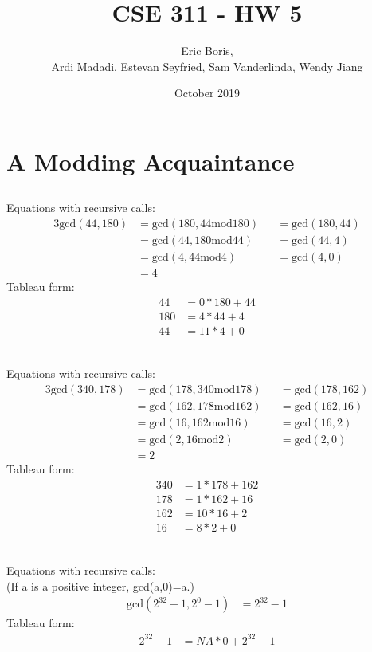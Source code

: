\documentclass[11pt]{article}
\title{CSE 311 - HW 5}
\author{Eric Boris, \\ Ardi Madadi, Estevan Seyfried, Sam Vanderlinda, Wendy Jiang}
\date{October 2019}
\makeatletter
\renewcommand{\maketitle}{\bgroup\setlength{\parindent}{0pt}
\begin{flushleft}
  \textbf{\@title}

  \@author
  
  \@date
\end{flushleft}\egroup
}
\makeatother
\begin{document}
\maketitle

\section{A Modding Acquaintance} %
\subsection{} %
Equations with recursive calls:
\begin{alignat*}{3}
	\text{gcd}(44, 180) &= \text{gcd}(180, 44\text{mod}180) &&= \text{gcd}(180, 44) \\
	&= \text{gcd}(44, 180\text{mod}44) &&= \text{gcd}(44, 4) \\
	&= \text{gcd}(4, 44\text{mod}4) &&= \text{gcd}(4, 0) \\
	&= 4
\end{alignat*}
Tableau form:
\begin{align*}
	44 &= 0 * 180 + 44 \\
	180 &= 4 * 44 + 4 \\
	44 &= 11 * 4 + 0 \\
\end{align*}
\subsection{} %
Equations with recursive calls:
\begin{alignat*}{3}
	\text{gcd}(340, 178) &= \text{gcd}(178, 340\text{mod}178) &&= \text{gcd}(178, 162) \\
	&= \text{gcd}(162, 178\text{mod}162) &&= \text{gcd}(162, 16) \\
	&= \text{gcd}(16, 162\text{mod}16) &&= \text{gcd}(16, 2) \\
	&= \text{gcd}(2, 16\text{mod}2) &&= \text{gcd}(2, 0) \\
	&= 2
\end{alignat*}
Tableau form:
\begin{align*}
	340 &= 1 * 178 + 162 \\
	178 &= 1 * 162 + 16 \\
	162 &= 10 * 16 + 2 \\
	16 &= 8 * 2 + 0 \\	
\end{align*}
\subsection{} %
Equations with recursive calls:\\
(If a is a positive integer, gcd(a,0)=a.)
\begin{align*}
	\text{gcd}(2^{32}-1, 2^0-1) &= 2^{32}-1
\end{align*}
Tableau form:
\begin{align*}
	2^{32}-1 &= NA * 0 + 2^{32}-1 \\
\end{align*}
\end{document}
